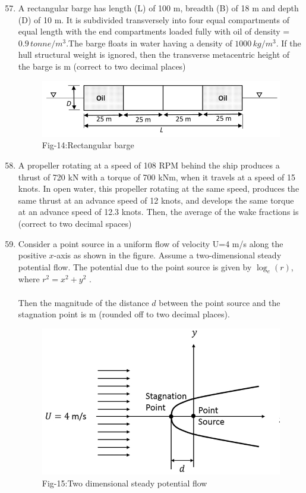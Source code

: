 \documentclass[journal]{IEEEtran}
\theoremstyle{remark}
\begin{document}
\begin{enumerate}[itemsep=1em]
\setcounter{enumi}{56}
\item A rectangular barge has length (L) of 100 m, breadth (B) of 18 m and depth (D) of 10 m. It is subdivided transversely into four equal compartments of equal length with the end compartments loaded fully with oil of density = $0.9\, tonne/m^3$.The barge floats in water having a density of $1000\, kg/m^3$. If the hull structural weight is ignored, then the transverse metacentric height of the barge is \underline{\hspace{1cm}} m (correct to two decimal places)
\begin{figure}[H]
    \centering
    \includegraphics[width=0.4\columnwidth]{figs/fig-14.jpeg}
    \caption*{Fig-14:Rectangular barge}
    \label{fig-14}
\end{figure}
\end{enumerate}
\begin{enumerate}[itemsep=1em]
\setcounter{enumi}{57}
\item A propeller rotating at a speed of 108 RPM behind the ship produces a thrust of 720 kN with a torque of 700 kNm, when it travels at a speed of 15 knots. In open water, this propeller rotating at the same speed, produces the same thrust at an advance speed of 12 knots, and develops the same torque at an advance speed of 12.3 knots. Then, the average of the wake fractions is \underline{\hspace{1cm}}(correct to two decimal spaces)
\end{enumerate}
\newpage
\vspace*{0.25cm}

\begin{enumerate}[itemsep=1em]
\setcounter{enumi}{58}
\item Consider a point source in a uniform flow of velocity U=4 m/s along the positive $x$-axis as shown in the figure. Assume a two-dimensional steady potential flow. The potential due to the point source is given by $\log_e(r)$, where $r^2=x^2+y^2$ .  \\
\\
Then the magnitude of the distance $d$ between the point source and the stagnation point is \underline{\hspace{2cm}} m (rounded off to two decimal places). 
\begin{figure}[H]
    \centering
    \includegraphics[width=0.4\columnwidth]{figs/fig-15.jpeg}
    \caption*{Fig-15:Two dimensional steady potential flow}
    \label{fig-15}
\end{figure}
\end{enumerate}
\end{document}
